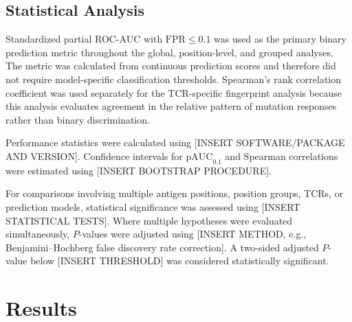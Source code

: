 \subsection{Statistical Analysis}

Standardized partial ROC-AUC with $\mathrm{FPR} \leq 0.1$ was used as the
primary binary prediction metric throughout the global, position-level, and
grouped analyses. The metric was calculated from continuous prediction scores
and therefore did not require model-specific classification thresholds.
Spearman's rank correlation coefficient was used separately for the
TCR-specific fingerprint analysis because this analysis evaluates agreement
in the relative pattern of mutation responses rather than binary
discrimination.

Performance statistics were calculated using [INSERT SOFTWARE/PACKAGE AND
VERSION]. Confidence intervals for $\mathrm{pAUC}_{0.1}$ and Spearman
correlations were estimated using [INSERT BOOTSTRAP PROCEDURE].

For comparisons involving multiple antigen positions, position groups, TCRs,
or prediction models, statistical significance was assessed using
[INSERT STATISTICAL TESTS]. Where multiple hypotheses were evaluated
simultaneously, $P$-values were adjusted using [INSERT METHOD, e.g.,
Benjamini--Hochberg false discovery rate correction]. A two-sided adjusted
$P$-value below [INSERT THRESHOLD] was considered statistically significant.

\section{Results}

